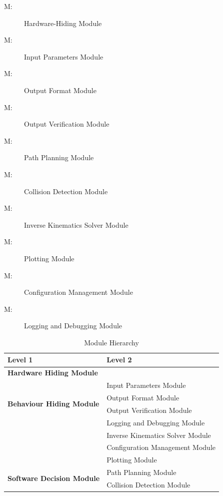 \documentclass[12pt, titlepage]{article}
\newcounter{mnum}
\newcommand{\mthemnum}{M\themnum}
\begin{document}
\begin{description}
\item [ \mthemnum \label{mHH1}:] Hardware-Hiding Module
\item [ \mthemnum \label{mHH2}:] Input Parameters Module
\item [ \mthemnum \label{mHH3}:] Output Format Module
\item [ \mthemnum \label{mHH4}:] Output Verification Module
\item [ \mthemnum \label{mHH5}:] Path Planning Module
\item [ \mthemnum \label{mHH6}:] Collision Detection Module
\item [ \mthemnum \label{mHH7}:] Inverse Kinematics Solver Module
\item [ \mthemnum \label{mHH8}:] Plotting Module
\item [ \mthemnum \label{mHH9}:] Configuration Management Module
\item [ \mthemnum \label{mHH10}:] Logging and Debugging Module

\end{description}


\begin{table}[h!]
  \centering
  \begin{tabular}{p{} p{}}
  \toprule
  \textbf{Level 1} & \textbf{Level 2}\\
  \midrule
  \textbf{Hardware Hiding Module} & \\
  \midrule
  \multirow{4}{0.3\textwidth}{\textbf{Behaviour Hiding Module}} 
  & Input Parameters Module \\
  & Output Format Module \\
  & Output Verification Module \\
  & Logging and Debugging Module \\
  & Inverse Kinematics Solver Module \\
  & Configuration Management Module \\
  & Plotting Module \\
  \midrule
  \multirow{3}{0.3\textwidth}{\textbf{Software Decision Module}} 
  & Path Planning Module \\
  & Collision Detection Module \\
  \bottomrule
  \end{tabular}
  \caption{Module Hierarchy}
  \label{TblMH}
  \end{table}
  
\end{document}
